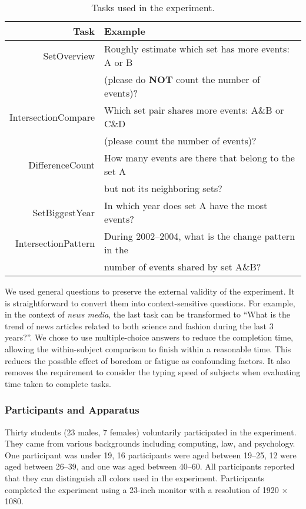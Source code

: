 \begin{table}[!htb]
\centering
\sffamily\small
\caption{Tasks used in the experiment.}
\label{table:tasks}
\begin{tabular}{rl}
	\toprule
	\textbf{Task} & \textbf{Example} \\
	\midrule
	SetOverview & Roughly estimate which set has more events:  A or B \\&(please do \textbf{NOT} count the number of events)? \\
 	IntersectionCompare & Which set pair shares more events: A\&B or C\&D\\&  (please count the number of events)? \\
 	DifferenceCount & How many events are there that belong to the set A \\&but not its neighboring sets? \\
 	SetBiggestYear & In which year does set A have the most events? \\
 	IntersectionPattern & During 2002--2004, what is the change pattern in the \\& number of  events shared by set A\&B?\\
	\bottomrule
\end{tabular}
\end{table}


We used general questions to preserve the external validity of the experiment. It is straightforward to convert them into context-sensitive questions. For example, in the context of \textit{news media}, the last task can be transformed to ``What is the trend of news articles related to both science and fashion during the last 3 years?''. We chose to use multiple-choice answers to reduce the completion time, allowing the within-subject comparison to finish within a reasonable time. This reduces the possible effect of boredom or fatigue as confounding factors. It also removes the requirement to consider the typing speed of subjects when evaluating time taken to complete tasks.

\subsubsection{Participants and Apparatus} Thirty students (23 males, 7 females) voluntarily participated in the experiment. They came from various backgrounds including computing, law, and psychology. One participant was under 19, 16 participants were aged between 19--25, 12 were aged between 26--39, and one was aged between 40--60. All participants reported that they can distinguish all colors used in the experiment. Participants completed the experiment using a 23-inch monitor with a resolution of 1920 $\times$ 1080.

